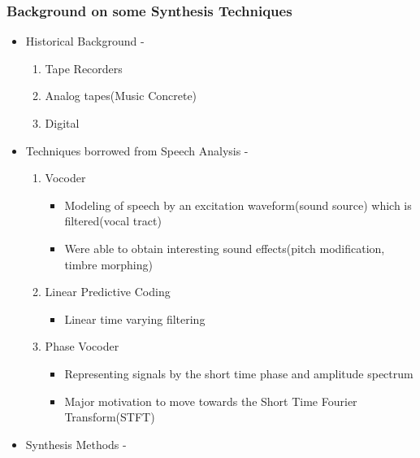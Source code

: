 \documentclass[11pt]{article}
\providecommand{\tightlist}{%
      \setlength{\itemsep}{0pt}\setlength{\parskip}{0pt}}
\begin{document}
    \subsubsection{Background on some Synthesis
Techniques}\label{background-on-some-synthesis-techniques}

    \begin{itemize}
\tightlist
\item
  Historical Background -

  \begin{enumerate}
  \def\labelenumi{\arabic{enumi}.}
  \tightlist
  \item
    Tape Recorders
  \item
    Analog tapes(Music Concrete)
  \item
    Digital
  \end{enumerate}
\item
  Techniques borrowed from Speech Analysis -

  \begin{enumerate}
  \def\labelenumi{\arabic{enumi}.}
  \tightlist
  \item
    Vocoder

    \begin{itemize}
    \tightlist
    \item
      Modeling of speech by an excitation waveform(sound source) which
      is filtered(vocal tract)
    \item
      Were able to obtain interesting sound effects(pitch modification,
      timbre morphing)
    \end{itemize}
  \item
    Linear Predictive Coding

    \begin{itemize}
    \tightlist
    \item
      Linear time varying filtering
    \end{itemize}
  \item
    Phase Vocoder

    \begin{itemize}
    \tightlist
    \item
      Representing signals by the short time phase and amplitude
      spectrum
    \item
      Major motivation to move towards the Short Time Fourier
      Transform(STFT)
    \end{itemize}
  \end{enumerate}
\item
  Synthesis Methods -


\end{itemize}
\end{document}
